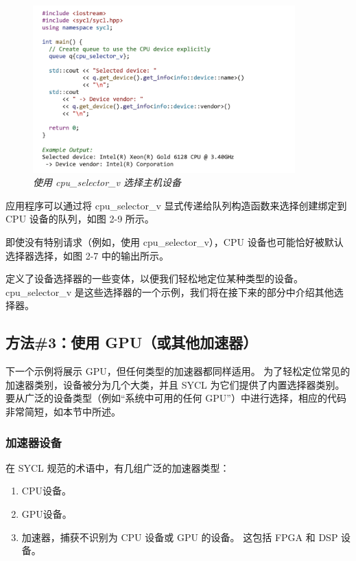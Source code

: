 \begin{figure}[H]
	\centering
	\includegraphics[width=0.9\textwidth]{figs/F2.9.png}
	\caption{\textit{使用 cpu\_selector\_v 选择主机设备}}
\end{figure}

应用程序可以通过将 cpu\_selector\_v 显式传递给队列构造函数来选择创建绑定到 CPU 设备的队列，如图 2-9 所示。

即使没有特别请求（例如，使用 cpu\_selector\_v），CPU 设备也可能恰好被默认选择器选择，如图 2-7 中的输出所示。

定义了设备选择器的一些变体，以便我们轻松地定位某种类型的设备。 
cpu\_selector\_v 是这些选择器的一个示例，我们将在接下来的部分中介绍其他选择器。

\subsection{方法\#3：使用 GPU（或其他加速器）}
下一个示例将展示 GPU，但任何类型的加速器都同样适用。 
为了轻松定位常见的加速器类别，设备被分为几个大类，并且 SYCL 为它们提供了内置选择器类别。 
要从广泛的设备类型（例如“系统中可用的任何 GPU”）中进行选择，相应的代码非常简短，如本节中所述。

\subsubsection{加速器设备}
在 SYCL 规范的术语中，有几组广泛的加速器类型：

\begin{enumerate}
	\item CPU设备。

	\item GPU设备。

	\item 加速器，捕获不识别为 CPU 设备或 GPU 的设备。 这包括 FPGA 和 DSP 设备。
\end{enumerate}

